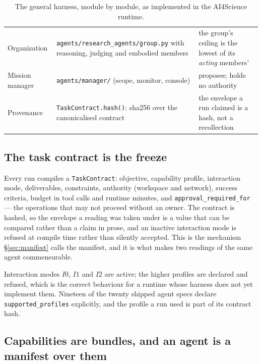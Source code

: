 \documentclass[11pt]{article}
\theoremstyle{definition}
\begin{document}
\begin{table}[!htbp]
\begin{tabularx}{\textwidth}{@{}lYY@{}}
Organization & \texttt{agents/research\_agents/group.py} with reasoning, judging and embodied members & the group's ceiling is the lowest of its \emph{acting} members' \\
Mission manager & \texttt{agents/manager/} (scope, monitor, console) & proposes; holds no authority \\
Provenance & \texttt{TaskContract.hash()}: sha256 over the canonicalised contract & the envelope a run claimed is a hash, not a recollection \\
\bottomrule
\end{tabularx}
\caption{The general harness, module by module, as implemented in the AI4Science runtime.}
\label{tab:asbuilt}
\end{table}

\subsection{The task contract is the freeze}

Every run compiles a \texttt{TaskContract}: objective, capability profile, interaction mode, deliverables, constraints, authority (workspace and network), success criteria, budget in tool calls and runtime minutes, and \texttt{approval\_required\_for} --- the operations that may not proceed without an owner. The contract is hashed, so the envelope a reading was taken under is a value that can be compared rather than a claim in prose, and an inactive interaction mode is refused at compile time rather than silently accepted. This is the mechanism \S\ref{sec:manifest} calls the manifest, and it is what makes two readings of the same agent commensurable.

Interaction modes $I0$, $I1$ and $I2$ are active; the higher profiles are declared and refused, which is the correct behaviour for a runtime whose harness does not yet implement them. Nineteen of the twenty shipped agent specs declare \texttt{supported\_profiles} explicitly, and the profile a run used is part of its contract hash.

\subsection{Capabilities are bundles, and an agent is a manifest over them}
\end{document}

